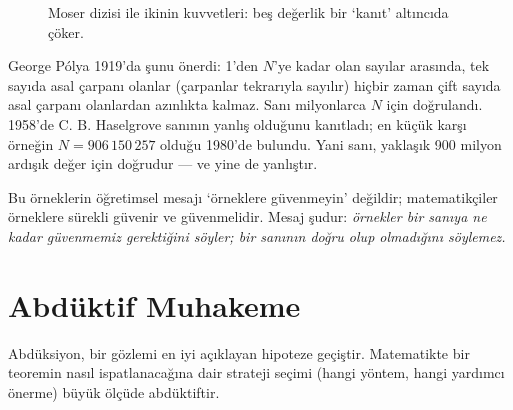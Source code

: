\begin{figure}[h]
\centering
{}
\caption{Moser dizisi ile ikinin kuvvetleri: beş değerlik bir ‘kanıt’ altıncıda çöker.}
\end{figure}


\begin{ornek}
George Pólya 1919’da şunu önerdi: 1’den $N$’ye kadar olan sayılar arasında, tek sayıda asal çarpanı olanlar (çarpanlar tekrarıyla sayılır) hiçbir zaman çift sayıda asal çarpanı olanlardan azınlıkta kalmaz. Sanı milyonlarca $N$ için doğrulandı. 1958’de C. B. Haselgrove sanının yanlış olduğunu kanıtladı; en küçük karşı örneğin $N=906\,150\,257$ olduğu 1980’de bulundu. Yani sanı, yaklaşık 900 milyon ardışık değer için doğrudur — ve yine de yanlıştır.
\end{ornek}

Bu örneklerin öğretimsel mesajı ‘örneklere güvenmeyin’ değildir; matematikçiler örneklere sürekli güvenir ve güvenmelidir. Mesaj şudur: \emph{örnekler bir sanıya ne kadar güvenmemiz gerektiğini söyler; bir sanının doğru olup olmadığını söylemez.}

\section{Abdüktif Muhakeme}\label{sec:abduksiyon}

Abdüksiyon, bir gözlemi en iyi açıklayan hipoteze geçiştir. Matematikte bir teoremin nasıl ispatlanacağına dair strateji seçimi (hangi yöntem, hangi yardımcı önerme) büyük ölçüde abdüktiftir.

